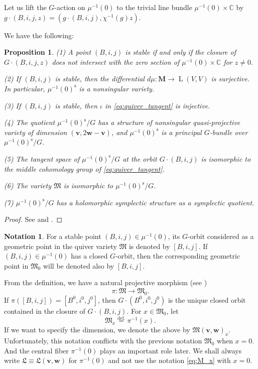\documentclass[12pt]{amsart}
\def\Bbb{\mathbb}
\def\frak{\mathfrak}
\newcommand{\rom}{\textup}
\newtheorem{Proposition}[equation]{Proposition}
\theoremstyle{definition}
\newtheorem{Notation}[equation]{Notation}
\theoremstyle{remark}
\numberwithin{equation}{subsection}
\newcommand{\defeq}{\overset{\operatorname{\scriptstyle def.}}{=}}
\newcommand{\C}{{\Bbb C}}
\newcommand{\bM}{{\mathbf M}} %
\newcommand{\M}{{\frak M}} %
\newcommand{\La}{{\frak L}} %
\newcommand{\bv}{{\mathbf v}} %
\newcommand{\bw}{{\mathbf w}} %
\newcommand{\HomL}{\operatorname{L}}
\begin{document}
Let us lift the $G$-action on $\mu^{-1}(0)$ to the trivial line bundle
$\mu^{-1}(0) \times \C$ by $g\cdot(B,i,j,z) = (g\cdot (B,i,j),
\chi^{-1}(g)z)$.

We have the following:
\begin{Proposition}\label{prop:stable}
\rom{(1)} A point $(B,i,j)$ is stable if and only if the closure of 
$G\cdot(B,i,j,z)$ does not intersect with the zero section
of $\mu^{-1}(0) \times \C$ for $z\neq 0$.

\rom{(2)} If $(B,i,j)$ is stable, then the differential
$d\mu\colon \bM \to \HomL(V,V)$ is surjective. In particular,
$\mu^{-1}(0)^{\operatorname{s}}$ is a nonsingular variety.

\rom{(3)} If $(B,i,j)$ is stable, then $\iota$ in
\eqref{eq:quiver_tangent} is injective.

\rom{(4)} The quotient $\mu^{-1}(0)^{\operatorname{s}}/G$ has a
structure of nonsingular quasi-projective variety
of dimension $(\bv, 2\bw - \bv)$, and
$\mu^{-1}(0)^{\operatorname{s}}$ is a principal $G$-bundle
over $\mu^{-1}(0)^{\operatorname{s}}/G$.

\rom{(5)} The tangent space of $\mu^{-1}(0)^{\operatorname{s}}/G$ at
the orbit $G\cdot(B,i,j)$ is isomorphic to the middle cohomology group 
of \eqref{eq:quiver_tangent}.

\rom{(6)} The variety $\M$ is isomorphic to
$\mu^{-1}(0)^{\operatorname{s}}/G$.

\rom{(7)} $\mu^{-1}(0)^{\operatorname{s}}/G$ has a holomorphic
symplectic structure as a symplectic quotient.
\end{Proposition}

\begin{proof}
See \cite[3.ii]{Na-alg} and \cite[2.8]{Na-quiver}.
\end{proof}

\begin{Notation}
For a stable point $(B, i, j)\in\mu^{-1}(0)$, its $G$-orbit
considered as a geometric point in the quiver variety $\M$ is denoted by 
$[B, i, j]$.
%
If $(B, i, j)\in\mu^{-1}(0)$ has a closed $G$-orbit, then the
corresponding geometric point in $\M_0$ will be denoted also by 
$[B, i, j]$.
\end{Notation}

From the definition, we have a natural projective morphism
(see \cite[3.18]{Na-alg})
\begin{equation}\label{eq:pi_def}
      \pi\colon \M \to \M_0.
\end{equation}
If $\pi([B,i,j]) = [B^0,i^0,j^0]$, then $G\cdot(B^0, i^0, j^0)$ 
is the unique closed orbit contained in the
closure of $G\cdot(B, i, j)$.
%
For $x\in \M_0$, let
\begin{equation}
\label{eq:M_x}
   \M_x \defeq \pi^{-1}(x).
\end{equation}
If we want to specify the dimension, we denote the above by
$\M(\bv,\bw)_x$.
%
Unfortunately, this notation conflicts with the previous notation
$\M_0$ when $x = 0$.  And the central fiber $\pi^{-1}(0)$ plays an
important role later.  We shall always write $\La \equiv \La(\bv,\bw)$
for $\pi^{-1}(0)$ and not use the notation \eqref{eq:M_x} with $x =
0$.
\end{document}
